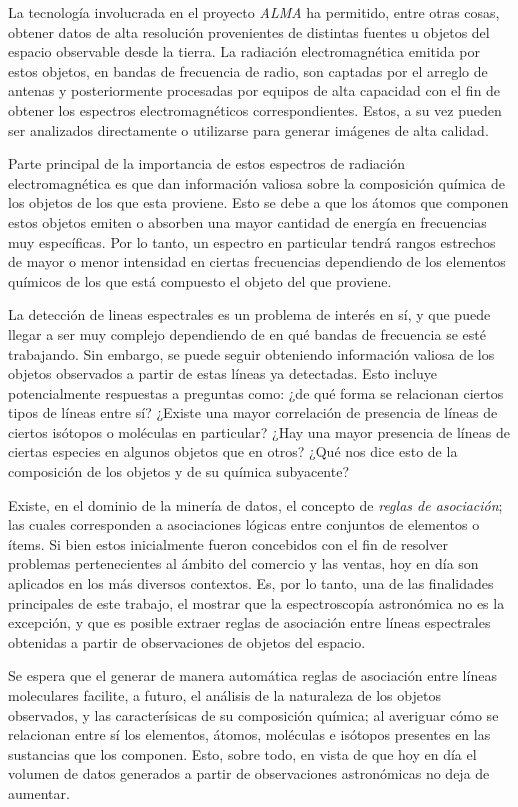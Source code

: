 \begin{intro}
La tecnología involucrada en el proyecto \textit{ALMA} ha permitido, entre otras cosas, obtener datos de alta resolución provenientes de distintas fuentes u objetos del espacio observable desde la tierra. La radiación electromagnética emitida por estos objetos, en bandas de frecuencia de radio, son captadas por el arreglo de antenas y posteriormente procesadas por equipos de alta capacidad con el fin de obtener los espectros electromagnéticos correspondientes. Estos, a su vez pueden ser analizados directamente o utilizarse para generar imágenes de alta calidad.

Parte principal de la importancia de estos espectros de radiación electromagnética es que dan información valiosa sobre la composición química de los objetos de los que esta proviene. Esto se debe a que los átomos que componen estos objetos emiten o absorben una mayor cantidad de energía en frecuencias muy específicas. Por lo tanto, un espectro en particular tendrá rangos estrechos de mayor o menor intensidad en ciertas frecuencias dependiendo de los elementos químicos de los que está compuesto el objeto del que proviene.

La detección de lineas espectrales es un problema de interés en sí, y que puede llegar a ser muy complejo dependiendo de en qué bandas de frecuencia se esté trabajando. Sin embargo, se puede seguir obteniendo información valiosa de los objetos observados a partir de estas líneas ya detectadas. Esto incluye potencialmente respuestas a preguntas como: ¿de qué forma se relacionan ciertos tipos de líneas entre sí? ¿Existe una mayor correlación de presencia de líneas de ciertos isótopos o moléculas en particular? ¿Hay una mayor presencia de líneas de ciertas especies en algunos objetos que en otros? ¿Qué nos dice esto de la composición de los objetos y de su química subyacente?

Existe, en el dominio de la minería de datos, el concepto de \textit{reglas de asociación}; las cuales corresponden a asociaciones lógicas entre conjuntos de elementos o ítems. Si bien estos inicialmente fueron concebidos con el fin de resolver problemas pertenecientes al ámbito del comercio y las ventas, hoy en día son aplicados en los más diversos contextos. Es, por lo tanto, una de las finalidades principales de este trabajo, el mostrar que la espectroscopía astronómica no es la excepción, y que es posible extraer reglas de asociación entre líneas espectrales obtenidas a partir de observaciones de objetos del espacio.

Se espera que el generar de manera automática reglas de asociación entre líneas moleculares facilite, a futuro, el análisis de la naturaleza de los objetos observados, y las caracterísicas de su composición química; al averiguar cómo se relacionan entre sí los elementos, átomos, moléculas e isótopos presentes en las sustancias que los componen. Esto, sobre todo, en vista de que hoy en día el volumen de datos generados a partir de observaciones astronómicas no deja de aumentar.


\end{intro}

